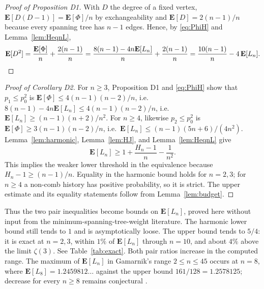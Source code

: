 \documentclass[11pt,a4paper]{amsart}
\theoremstyle{plain}
\theoremstyle{definition}
\theoremstyle{remark}
\newcommand{\E}{\mathbf{E}}
\begin{document}
\begin{proof}[Proof of Proposition D1]
With $D$ the degree of a fixed vertex, $\E[D(D-1)]=\E[\Phi]/n$ by exchangeability
and $\E[D]=2(n-1)/n$ because every spanning tree has $n-1$ edges. Hence, by
\eqref{eq:PhiH} and Lemma~\ref{lem:HeqnL},
\[
\E[D^2]=\frac{\E[\Phi]}n+\frac{2(n-1)}n
=\frac{8(n-1)-4n\E[L_n]}{n}+\frac{2(n-1)}n
=\frac{10(n-1)}n-4\,\E[L_n]. \qedhere
\]
\end{proof}

\begin{proof}[Proof of Corollary D2]
For $n\ge3$, Proposition D1 and \eqref{eq:PhiH} show that
$p_1\le p_0^2$ is
$\E[\Phi]\le4(n-1)(n-2)/n$, i.e.\ $8(n-1)-4n\E[L_n]\le4(n-1)(n-2)/n$, i.e.\
$\E[L_n]\ge(n-1)(n+2)/n^2$. For $n\ge4$, likewise $p_2\le p_0^2$ is
$\E[\Phi]\ge3(n-1)(n-2)/n$, i.e.\ $\E[L_n]\le(n-1)(5n+6)/(4n^2)$.
Lemma~\ref{lem:harmonic}, Lemma~\ref{lem:HJ}, and Lemma~\ref{lem:HeqnL} give
\[
\E[L_n]\ge1+\frac{H_n-1}{n}-\frac1{n^2}.
\]
This implies the weaker lower threshold in the equivalence because
$H_n-1\ge(n-1)/n$. Equality in the harmonic bound holds for $n=2,3$; for
$n\ge4$ a non-comb history has positive probability, so it is strict. The
upper estimate and its equality statements follow from Lemma~\ref{lem:budget}.
\end{proof}

Thus the two pair inequalities become bounds on $\E[L_n]$, proved here without
input from the minimum-spanning-tree-weight literature. The harmonic lower bound
still tends to $1$ and is asymptotically loose. The upper bound tends to $5/4$:
it is exact at $n=2,3$, within $1\%$ of $\E[L_n]$ through $n=10$, and about
$4\%$ above the limit $\zeta(3)$. See Table~\ref{tab:exact}. Both pair ratios
increase in the computed range. The maximum
of $\E[L_n]$ in Gamarnik's range $2\le n\le45$ occurs at $n=8$, where
$\E[L_8]=1.2459812\ldots$ against the upper bound $161/128=1.2578125$;
decrease for every $n\ge8$ remains conjectural \cite[Conjecture 4.1]{Gamarnik}.
\end{document}
